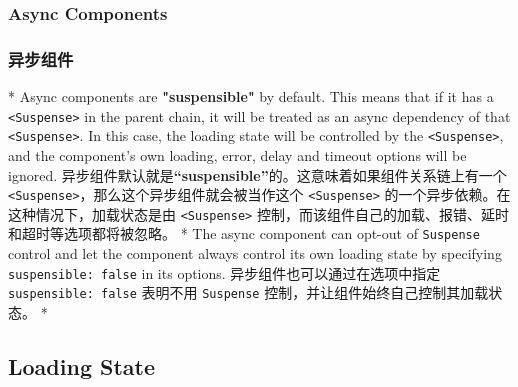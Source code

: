 \begin{paracol}{2}
\subsubsection{Async Components}
\switchcolumn
\subsubsection{异步组件}
\switchcolumn[0]*%
Async components are \textbf{"suspensible"} by default. This means that
if it has a \texttt{\textless{}Suspense\textgreater{}} in the parent
chain, it will be treated as an async dependency of that
\texttt{\textless{}Suspense\textgreater{}}. In this case, the loading
state will be controlled by the
\texttt{\textless{}Suspense\textgreater{}}, and the component's own
loading, error, delay and timeout options will be ignored.
\switchcolumn
异步组件默认就是\textbf{``suspensible''}的。这意味着如果组件关系链上有一个
\texttt{\textless{}Suspense\textgreater{}}，那么这个异步组件就会被当作这个
\texttt{\textless{}Suspense\textgreater{}}
的一个异步依赖。在这种情况下，加载状态是由
\texttt{\textless{}Suspense\textgreater{}}
控制，而该组件自己的加载、报错、延时和超时等选项都将被忽略。
\switchcolumn[0]*%
The async component can opt-out of \texttt{Suspense} control and let the
component always control its own loading state by specifying
\texttt{suspensible:\ false} in its options.
\switchcolumn
异步组件也可以通过在选项中指定 \texttt{suspensible:\ false} 表明不用
\texttt{Suspense} 控制，并让组件始终自己控制其加载状态。
\switchcolumn[0]*%
\subsection{Loading State}
\switchcolumn

\end{paracol}
